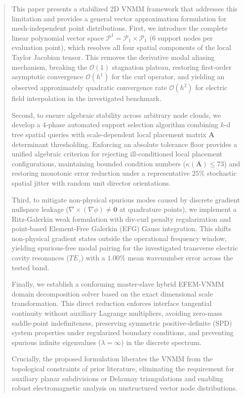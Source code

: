 \documentclass[preprint,12pt]{elsarticle}
\begin{document}
\begin{frontmatter}
\begin{abstract}
This paper presents a stabilized 2D VNMM framework that addresses this limitation and provides a general vector approximation formulation for mesh-independent point distributions. First, we introduce the complete linear polynomial vector space $\mathcal{P}^1 = \mathcal{P}_1 \times \mathcal{P}_1$ ($6$ support nodes per evaluation point), which resolves all four spatial components of the local Taylor Jacobian tensor. This removes the derivative modal aliasing mechanism, breaking the $\mathcal{O}(1)$ stagnation plateau, restoring first-order asymptotic convergence $\mathcal{O}(h^{1})$ for the curl operator, and yielding an observed approximately quadratic convergence rate $\mathcal{O}(h^{2})$ for electric field interpolation in the investigated benchmark.

Second, to ensure algebraic stability across arbitrary node clouds, we develop a 4-phase automated support selection algorithm combining $k$-d tree spatial queries with scale-dependent local placement matrix $\mathbf{A}$ determinant thresholding. Enforcing an absolute tolerance floor provides a unified algebraic criterion for rejecting ill-conditioned local placement configurations, maintaining bounded condition numbers ($\kappa(\mathbf{A}) \le 73$) and restoring monotonic error reduction under a representative $25\%$ stochastic spatial jitter with random unit director orientations.

Third, to mitigate non-physical spurious modes caused by discrete gradient nullspace leakage ($\nabla \times (\nabla \phi) \neq \mathbf{0}$ at quadrature points), we implement a Ritz-Galerkin weak formulation with div-curl penalty regularization and point-based Element-Free Galerkin (EFG) Gauss integration. This shifts non-physical gradient states outside the operational frequency window, yielding spurious-free modal pairing for the investigated transverse electric cavity resonances ($TE_z$) with a $1.00\%$ mean wavenumber error across the tested band.

Finally, we establish a conforming master-slave hybrid EFEM-VNMM domain decomposition solver based on the exact dimensional scale transformation. This direct reduction enforces interface tangential continuity without auxiliary Lagrange multipliers, avoiding zero-mass saddle-point indefiniteness, preserving symmetric positive-definite (SPD) system properties under regularized boundary conditions, and preventing spurious infinite eigenvalues ($\lambda = \infty$) in the discrete spectrum.

Crucially, the proposed formulation liberates the VNMM from the topological constraints of prior literature, eliminating the requirement for auxiliary planar subdivisions or Delaunay triangulations and enabling robust electromagnetic analysis on unstructured vector node distributions.
\end{abstract}


\end{frontmatter}
\end{document}
